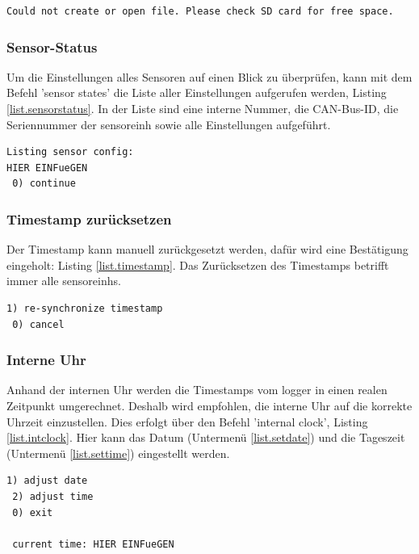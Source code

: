 \begin{lstlisting}[caption=Fehlermeldung beim Starten eines Sensors, label=list.sensorerror]
Could not create or open file. Please check SD card for free space.
\end{lstlisting}

\subsubsection{Sensor-Status}\label{sssec.sensorstate}
Um die Einstellungen alles Sensoren auf einen Blick zu überprüfen, kann mit dem Befehl 'sensor states' die Liste aller Einstellungen aufgerufen werden, Listing \ref{list.sensorstatus}. In der Liste sind eine interne Nummer, die CAN-Bus-ID, die Seriennummer der \gls{sensoreinh} sowie alle Einstellungen aufgeführt.

\begin{lstlisting}[caption=Untermenü Sensor-Status, label=list.sensorstatus]
Listing sensor config:
HIER EINFueGEN
 0) continue
\end{lstlisting}


\subsubsection{Timestamp zurücksetzen}\label{sssec.timestamp}
Der Timestamp kann manuell zurückgesetzt werden, dafür wird eine Bestätigung eingeholt: Listing \ref{list.timestamp}. Das Zurücksetzen des Timestamps betrifft immer alle \glspl{sensoreinh}.

\begin{lstlisting}[caption=Untermenü Timestamp zurücksetzen, label=list.timestamp]
 1) re-synchronize timestamp
 0) cancel
\end{lstlisting}


\subsubsection{Interne Uhr}\label{sssec.intclock}
Anhand der internen Uhr werden die Timestamps vom \gls{logger} in einen realen Zeitpunkt umgerechnet. Deshalb wird empfohlen, die interne Uhr auf die korrekte Uhrzeit einzustellen. Dies erfolgt über den Befehl 'internal clock', Listing \ref{list.intclock}. Hier kann das Datum (Untermenü \ref{list.setdate}) und die Tageszeit (Untermenü \ref{list.settime}) eingestellt werden.

\begin{lstlisting}[caption=Untermenü interne Uhr, label=list.intclock]
 1) adjust date
 2) adjust time
 0) exit

 current time: HIER EINFueGEN
\end{lstlisting}

